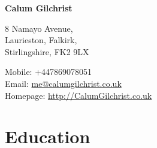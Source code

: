 \documentclass[11pt,a4paper]{article}
\def\name{Calum Gilchrist}
\begin{document}
%

\setlength{\parskip}{0em}


\centerline{\huge \bf \name}

\bigskip

\begin{minipage}[t]{0.495\textwidth}
  8 Namayo Avenue, \\
  Laurieston, Falkirk, \\
  Stirlingshire, FK2 9LX
\end{minipage}
\begin{minipage}[t]{0.495\textwidth}
  Mobile: +447869078051 \\
  Email: \href{mailto:me@calumgilchrist.co.uk}{me@calumgilchrist.co.uk} \\
  Homepage: \href{http://calumgilchrist.co.uk/}{http://CalumGilchrist.co.uk}
\end{minipage}

\section*{Education}
\end{document}
